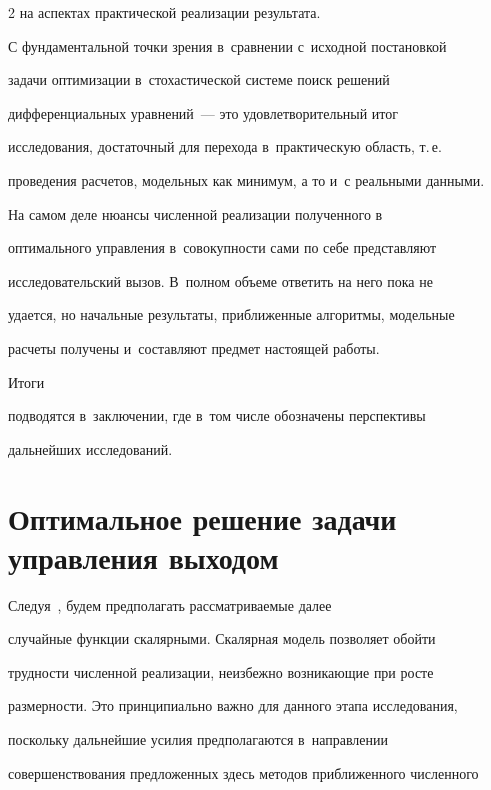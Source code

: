 \begin{multicols}{2}
на аспектах практической реализации результата.


     


     С фундаментальной точки зрения в~сравнении с~исходной постановкой 


задачи оптимизации в~стохастической системе поиск решений 


дифференциальных уравнений~--- это удовлетворительный итог 


исследования, достаточный для перехода в~практическую область, т.\,е.\ 


проведения расчетов, модельных как минимум, а то и~с реальными данными. 


На самом деле нюансы численной реализации полученного в~\cite{1-b} 


оптимального управления в~совокупности сами по себе представляют 


исследовательский вызов. В~полном объеме ответить на него пока не 


удается, но начальные результаты, приближенные алгоритмы, модельные 


расчеты получены и~составляют предмет настоящей работы. 





Итоги 


подводятся в~заключении, где в~том числе обозначены перспективы 


дальнейших исследований.





\section{Оптимальное решение задачи управления выходом}





     Следуя~\cite{1-b}, будем предполагать рас\-смат\-ри\-ва\-емые далее 


случайные функции скалярными. Скалярная модель позволяет обойти 


трудности численной реализации, неизбежно возникающие при рос\-те 


размерности. Это принципиально важно для данного этапа исследования, 


поскольку дальнейшие усилия предполагаются в~направлении 


совершенствования предложенных здесь методов приближенного численного 



\end{multicols}
